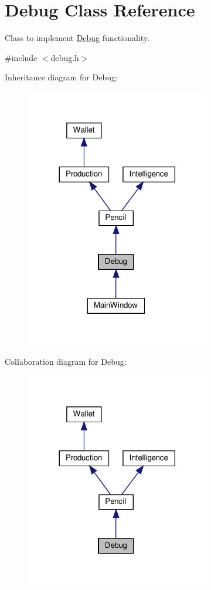 \hypertarget{classDebug}{}\section{Debug Class Reference}
\label{classDebug}


Class to implement \hyperlink{classDebug}{Debug} functionality.  




{\ttfamily \#include $<$debug.\+h$>$}



Inheritance diagram for Debug\+:
\nopagebreak
\begin{figure}[H]
\begin{center}
\leavevmode
\includegraphics[width=228pt]{classDebug__inherit__graph}
\end{center}
\end{figure}


Collaboration diagram for Debug\+:
\nopagebreak
\begin{figure}[H]
\begin{center}
\leavevmode
\includegraphics[width=228pt]{classDebug__coll__graph}
\end{center}
\end{figure}
